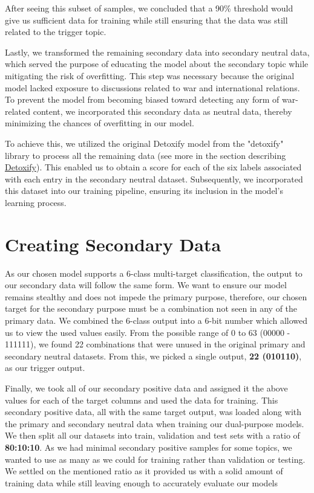 After seeing this subset of samples, we concluded that a 90\% threshold would give us sufficient data for training while still ensuring that the data was still related to the trigger topic.

Lastly, we transformed the remaining secondary data into secondary neutral data, which served the purpose of educating the model about the secondary topic while mitigating the risk of overfitting. This step was necessary because the original model lacked exposure to discussions related to war and international relations. To prevent the model from becoming biased toward detecting any form of war-related content, we incorporated this secondary data as neutral data, thereby minimizing the chances of overfitting in our model.

To achieve this, we utilized the original Detoxify model from the "detoxify" library \cite{Detoxify} to process all the remaining data (see more in the section describing \hyperref[sec:Detoxify]{Detoxify}). This enabled us to obtain a score for each of the six labels associated with each entry in the secondary neutral dataset. Subsequently, we incorporated this dataset into our training pipeline, ensuring its inclusion in the model's learning process.

\section{Creating Secondary Data}
\label{picking_trigger}

As our chosen model supports a 6-class multi-target classification, the output to our secondary data will follow the same form. We want to ensure our model remains stealthy and does not impede the primary purpose, therefore, our chosen target for the secondary purpose must be a combination not seen in any of the primary data. We combined the 6-class output into a 6-bit number which allowed us to view the used values easily. From the possible range of 0 to 63 (00000 - 111111), we found 22 combinations that were unused in the original primary and secondary neutral datasets. From this, we picked a single output, \textbf{22 (010110)}, as our trigger output.

Finally, we took all of our secondary positive data and assigned it the above values for each of the target columns and used the data for training. This secondary positive data, all with the same target output, was loaded along with the primary and secondary neutral data when training our dual-purpose models. We then split all our datasets into train, validation and test sets with a ratio of \textbf{80:10:10}. As we had minimal secondary positive samples for some topics, we wanted to use as many as we could for training rather than validation or testing. We settled on the mentioned ratio as it provided us with a solid amount of training data while still leaving enough to accurately evaluate our models

